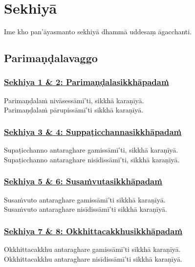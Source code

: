 \section{Sekhiyā}
\label{sekh}

\begin{intro}
  Ime kho pan'āyasmanto sekhiyā dhammā uddesaṃ āgacchanti.
\end{intro}

\setsubsecheadstyle{\subsectionFmt}
\subsection{Parimaṇḍalavaggo}
\vspace{0.2cm}

\subsubsection*{\hyperref[training1-2]{Sekhiya 1 \& 2: Parimaṇḍalasikkhāpadaṁ}}
\label{sekh1-2}
Parimaṇḍalaṁ nivāsessāmī'ti, sikkhā karaṇīyā.\\
Parimaṇḍalaṁ pārupissāmī'ti sikkhā karaṇīyā.

\subsubsection*{\hyperref[training3-4]{Sekhiya 3 \& 4: Suppaṭicchannasikkhāpadaṁ}}
\label{sekh3-4}
Supaṭicchanno antaraghare gamissāmī'ti, sikkhā karaṇīyā.\\
Supaṭicchanno antaraghare nisīdissāmī'ti, sikkhā karaṇīyā.

\subsubsection*{\hyperref[training5-6]{Sekhiya 5 \& 6: Susaṁvutasikkhāpadaṁ}}
\label{sekh5-6}
Susaṁvuto antaraghare gamissāmī'ti sikkhā karaṇīyā.\\
Susaṁvuto antaraghare nisīdissāmī'ti sikkhā karaṇīyā.

\subsubsection*{\hyperref[training7-8]{Sekhiya 7 \& 8: Okkhittacakkhusikkhāpadaṁ}}
\label{sekh7-8}
Okkhittacakkhu antaraghare gamissāmī'ti sikkhā karaṇīyā.\\
Okkhittacakkhu antaraghare nisīdissāmī'ti sikkhā karaṇīyā.

